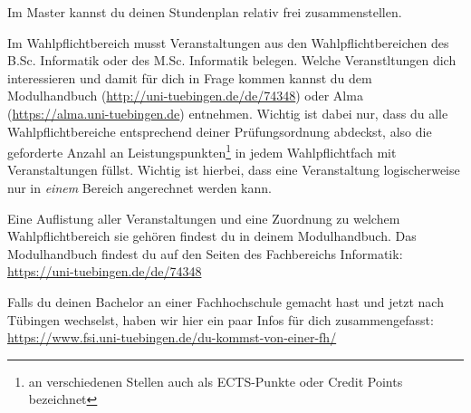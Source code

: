 Im Master kannst du deinen Stundenplan relativ frei zusammenstellen.

\iflehramt
	Im Wahlpflichtbereich musst Veranstaltungen aus den Wahlpflichtbereichen des B.Sc. Informatik oder des M.Sc. Informatik belegen. 
	Welche Veranstltungen dich interessieren und damit für dich in Frage kommen kannst du dem Modulhandbuch (\url{http://uni-tuebingen.de/de/74348}) oder Alma (\url{https://alma.uni-tuebingen.de}) entnehmen.
\else
	Wichtig ist dabei nur, dass du alle Wahlpflichtbereiche entsprechend deiner Prüfungsordnung abdeckst,
	also die geforderte Anzahl an Leistungspunkten\footnote{an verschiedenen Stellen auch als ECTS-Punkte oder Credit Points bezeichnet}
	in jedem Wahlpflichtfach mit Veranstaltungen füllst. Wichtig ist hierbei, dass eine Veranstaltung logischerweise nur in \emph{einem} Bereich angerechnet
	werden kann.

	Eine Auflistung aller Veranstaltungen und eine Zuordnung zu welchem Wahlpflichtbereich sie gehören
	findest du in deinem Modulhandbuch. Das Modulhandbuch findest du auf den Seiten des Fachbereichs Informatik: \\
	\url{https://uni-tuebingen.de/de/74348}

	Falls du deinen Bachelor an einer Fachhochschule gemacht hast und jetzt nach Tübingen wechselst, haben wir hier ein paar Infos für dich zusammengefasst: \\
	\url{https://www.fsi.uni-tuebingen.de/du-kommst-von-einer-fh/}
\fi

